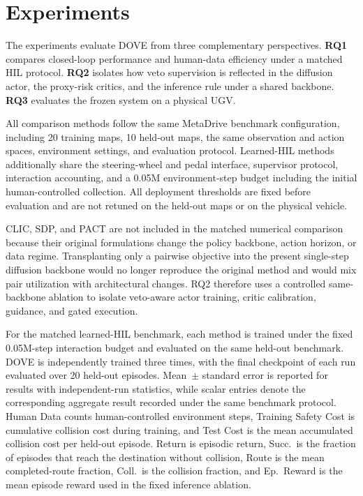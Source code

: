 \documentclass[9pt,journal]{IEEEtran}
\newcommand{\DOVE}{DOVE}
\begin{document}
\section{Experiments}
\label{sec:experiments}

The experiments evaluate \DOVE{} from three complementary perspectives.
\textbf{RQ1} compares closed-loop performance and human-data efficiency
under a matched HIL protocol. \textbf{RQ2} isolates how veto supervision
is reflected in the diffusion actor, the proxy-risk critics, and the
inference rule under a shared backbone. \textbf{RQ3} evaluates the frozen
system on a physical UGV.


All comparison methods follow the same MetaDrive benchmark configuration,
including 20 training maps, 10 held-out maps, the same observation and
action spaces, environment settings, and evaluation protocol. Learned-HIL
methods additionally share the steering-wheel and pedal interface,
supervisor protocol, interaction accounting, and a 0.05M environment-step
budget including the initial human-controlled collection. All deployment
thresholds are fixed before evaluation and are not retuned on the held-out
maps or on the physical vehicle.

CLIC, SDP, and PACT are not included in the matched numerical comparison because their original formulations change the policy backbone, action horizon, or data regime. Transplanting only a pairwise objective into the present single-step diffusion backbone would no longer reproduce the original method and would mix pair utilization with architectural changes. RQ2 therefore uses a controlled same-backbone ablation to isolate veto-aware actor training, critic calibration, guidance, and gated execution.

For the matched learned-HIL benchmark, each method is trained under the fixed
0.05M-step interaction budget and evaluated on the same held-out benchmark.
\DOVE{} is independently trained three times, with the final checkpoint of
each run evaluated over 20 held-out episodes. Mean~\(\pm\) standard error is
reported for results with independent-run statistics, while scalar entries
denote the corresponding aggregate result recorded under the same benchmark
protocol. Human Data counts human-controlled environment steps, Training
Safety Cost is cumulative collision cost during training, and Test Cost is
the mean accumulated collision cost per held-out episode. Return is episodic
return, Succ.\ is the fraction of episodes that reach the destination without
collision, Route is the mean completed-route fraction, Coll.\ is the collision
fraction, and Ep.\ Reward is the mean episode reward used in the fixed
inference ablation.
\end{document}
